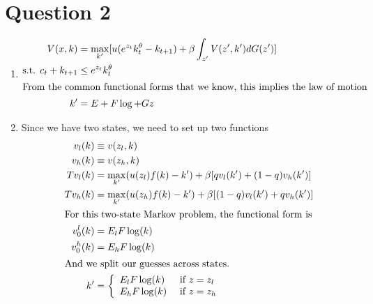 \documentclass[11pt]{article}
\begin{document}
\section{Question 2}
\label{sec:orgf6fb3b4}
\begin{enumerate}[label=(\alph*)]
  \item
\begin{align*}
V(x, k) &= \max_{k'}[u(e^{z_t} k_t^\theta - k_{t + 1}) + \beta \int_{z'} V(z', k') dG(z')]\\
\text{s.t. } c_t + k_{t + 1} &\le e^{z_t} k_t^\theta\\
\intertext{From the common functional forms that we know, this implies the law of motion}
k' &= E + F\log + Gz
\end{align*}
\item Since we have two states, we need to set up two functions
\begin{align*}
v_l(k) &\equiv v(z_l, k)\\
v_h(k) &\equiv v(z_h, k)\\
Tv_l(k) &= \max_{k'}(u(z_l)f(k) - k') + \beta [qv_l(k') + (1 - q)v_h(k')]\\
Tv_h(k) &= \max_{k'}(u(z_h)f(k) - k') + \beta [(1 - q)v_l(k') + q v_h(k')]\\
\intertext{For this two-state Markov problem, the functional form is}
v^l_0(k) &= E_l F \log(k)\\
v^h_0(k) &= E_h F \log(k)\\
\intertext{And we split our guesses across states.}
k' &= \left\{
\begin{array}{ll}
E_l F \log(k) &\text{ if } z = z_l\\
E_h F \log(k) &\text{ if } z = z_h\\
\end{array}
\right.
\end{align*}
  \end{enumerate}

\newpage
\end{document}
